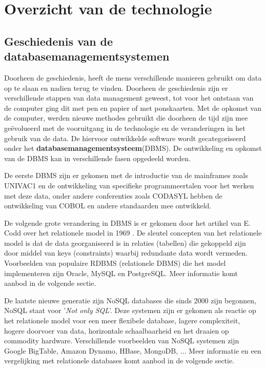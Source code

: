 \chapter{Overzicht van de technologie}
\section{Geschiedenis van de databasemanagementsystemen}
Doorheen de geschiedenis, heeft de mens verschillende manieren gebruikt om data op te slaan en nadien terug te vinden. Doorheen de geschiedenis zijn er verschillende stappen van data management geweest, tot voor het ontstaan van de computer ging dit met pen en papier of met ponskaarten\cite{gray2007data}. Met de opkomst van de computer, werden nieuwe methodes gebruikt die doorheen de tijd zijn mee geëvolueerd met de vooruitgang in de technologie en de veranderingen in het gebruik van de data. De hiervoor ontwikkelde software wordt gecategoriseerd onder het \textbf{databasemanagementsysteem}(DBMS). De ontwikkeling en opkomst van de DBMS kan in verschillende fasen opgedeeld worden.  

De eerste DBMS zijn er gekomen met de introductie van de mainframes zoals UNIVAC1 en de ontwikkeling van specifieke programmeertalen voor het werken met deze data, onder andere conferenties zoals CODASYL hebben de ontwikkeling van COBOL en andere standaarden mee ontwikkeld\cite{gray2007data}.    

De volgende grote verandering in DBMS is er gekomen door het artikel van E. Codd over het relationele model in 1969 \cite{codd1970relational}. De sleutel concepten van het relationele model is dat de data georganiseerd is in relaties (tabellen) die gekoppeld zijn door middel van keys (constraints) waarbij redundante data wordt vermeden. 
Voorbeelden van populaire RDBMS (relationele DBMS) die het model implementeren zijn Oracle, MySQL en PostgreSQL. Meer informatie komt aanbod in de volgende sectie. 

De laatste nieuwe generatie zijn NoSQL databases die sinds 2000 zijn begonnen, NoSQL staat voor '\textit{Not only SQL}'. Deze systemen zijn er gekomen als reactie op het relationele model voor een meer flexibele database, lagere complexiteit, hogere doorvoer van data, horizontale schaalbaarheid en het draaien op commodity hardware.  Verschillende voorbeelden van NoSQL systemen zijn Google BigTable, Amazon Dynamo, HBase, MongoDB, ... \cite{Strauch.NoSQL} Meer informatie en een vergelijking met relationele databases komt aanbod in de volgende sectie. 

